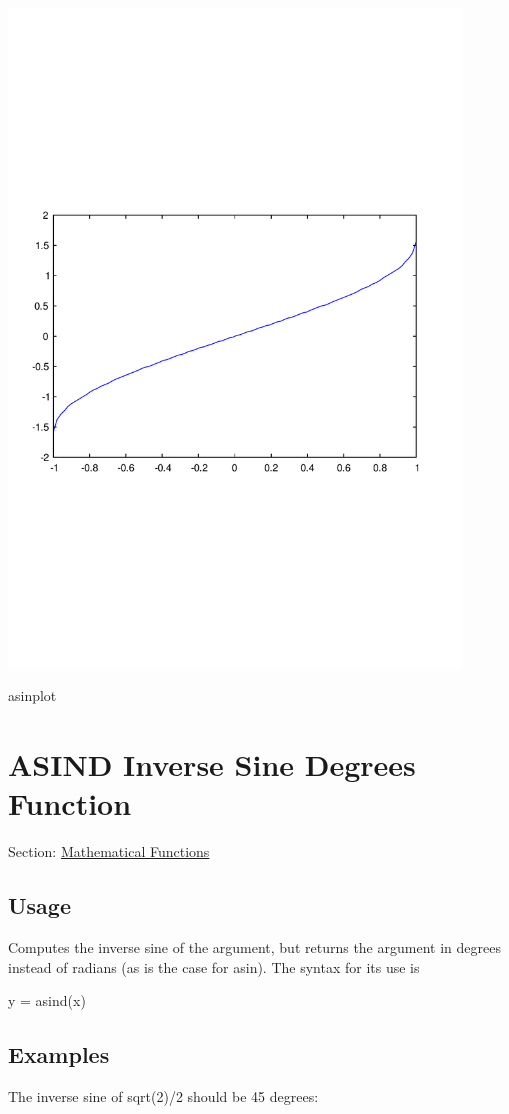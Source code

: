  
\begin{DoxyImage}
\includegraphics[width=12cm]{asinplot}
\caption{asinplot}
\end{DoxyImage}
 \hypertarget{mathfunctions_asind}{}\section{A\-S\-I\-N\-D Inverse Sine Degrees Function}\label{mathfunctions_asind}
Section\-: \hyperlink{sec_mathfunctions}{Mathematical Functions} \hypertarget{vtkwidgets_vtkxyplotwidget_Usage}{}\subsection{Usage}\label{vtkwidgets_vtkxyplotwidget_Usage}
Computes the inverse sine of the argument, but returns the argument in degrees instead of radians (as is the case for {\ttfamily asin}). The syntax for its use is \begin{DoxyVerb}   y = asind(x)
\end{DoxyVerb}
 \hypertarget{variables_matrix_Examples}{}\subsection{Examples}\label{variables_matrix_Examples}
The inverse sine of {\ttfamily sqrt(2)/2} should be 45 degrees\-:


